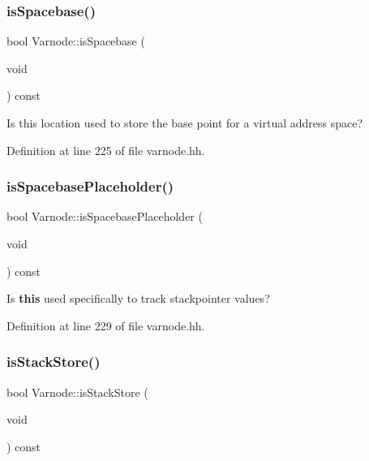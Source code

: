 \subsubsection{\texorpdfstring{isSpacebase()}{isSpacebase()}}
{\footnotesize\ttfamily bool Varnode\+::is\+Spacebase (\begin{DoxyParamCaption}\item[{void}]{ }\end{DoxyParamCaption}) const\hspace{0.3cm}{\ttfamily [inline]}}



Is this location used to store the base point for a virtual address space? 



Definition at line 225 of file varnode.\+hh.

\mbox{\label{class_varnode_a5af59f76912f944a4e20842d3c2bf2e0}} 
\subsubsection{\texorpdfstring{isSpacebasePlaceholder()}{isSpacebasePlaceholder()}}
{\footnotesize\ttfamily bool Varnode\+::is\+Spacebase\+Placeholder (\begin{DoxyParamCaption}\item[{void}]{ }\end{DoxyParamCaption}) const\hspace{0.3cm}{\ttfamily [inline]}}



Is {\bfseries{this}} used specifically to track stackpointer values? 



Definition at line 229 of file varnode.\+hh.

\mbox{\label{class_varnode_a517f55e86dd2f2c709bf107ccc088cb4}} 
\subsubsection{\texorpdfstring{isStackStore()}{isStackStore()}}
{\footnotesize\ttfamily bool Varnode\+::is\+Stack\+Store (\begin{DoxyParamCaption}\item[{void}]{ }\end{DoxyParamCaption}) const\hspace{0.3cm}{\ttfamily [inline]}}



